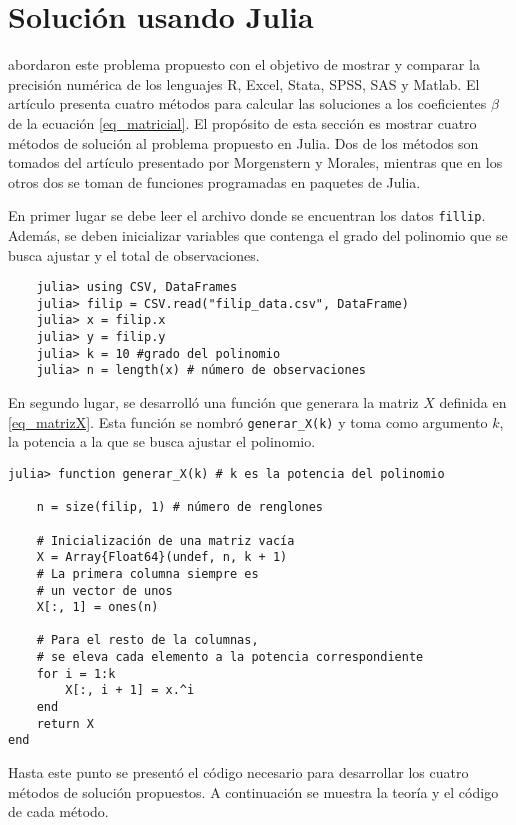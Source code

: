 \section{Solución usando Julia}

\cite{laberintos} abordaron este problema propuesto con el objetivo de mostrar y comparar la precisión numérica de los lenguajes \textsf{R, Excel, Stata, SPSS, SAS} y \textsf{Matlab}. El artículo presenta cuatro métodos para calcular las soluciones a los coeficientes $\beta$ de la ecuación \ref{eq_matricial}. El propósito de esta sección es mostrar cuatro métodos de solución al problema propuesto en \textsf{Julia}. Dos de los métodos son tomados del artículo presentado por Morgenstern y Morales, mientras que en los otros dos se toman de funciones programadas en paquetes de \textsf{Julia}. 

En primer lugar se debe leer el archivo donde se encuentran los datos \texttt{fillip}. Además, se deben inicializar variables que contenga el grado del polinomio que se busca ajustar y el total de observaciones. 

\begin{verbatim}
    julia> using CSV, DataFrames
    julia> filip = CSV.read("filip_data.csv", DataFrame)
    julia> x = filip.x
    julia> y = filip.y
    julia> k = 10 #grado del polinomio
    julia> n = length(x) # número de observaciones
\end{verbatim}

En segundo lugar, se desarrolló una función que generara la matriz $X$ definida en \ref{eq_matrizX}. Esta función se nombró \texttt{generar\_X(k)} y toma como argumento $k$, la potencia a la que se busca ajustar el polinomio. 


\begin{verbatim}
julia> function generar_X(k) # k es la potencia del polinomio

    n = size(filip, 1) # número de renglones
    
    # Inicialización de una matriz vacía
    X = Array{Float64}(undef, n, k + 1)
    # La primera columna siempre es 
    # un vector de unos
    X[:, 1] = ones(n)
    
    # Para el resto de la columnas,
    # se eleva cada elemento a la potencia correspondiente
    for i = 1:k
        X[:, i + 1] = x.^i
    end
    return X
end
\end{verbatim}

Hasta este punto se presentó el código necesario para desarrollar los cuatro métodos de solución propuestos. A continuación se muestra la teoría y el código de cada método. 


